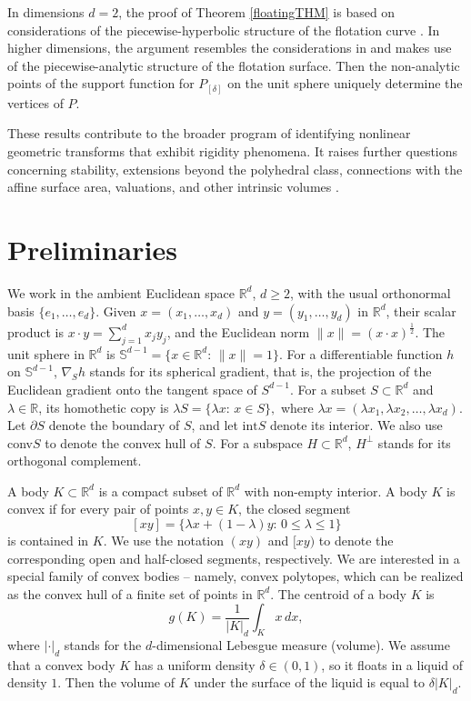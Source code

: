 \documentclass[12pt,letterpaper,reqno]{amsart}
\begin{document}
In dimensions $d=2$, the proof of Theorem \ref{floatingTHM} is based on considerations of the piecewise-hyperbolic structure of the flotation curve \cite{VP,Z}. In higher dimensions, the argument resembles the considerations in \cite{MR2018} and makes use of the piecewise-analytic structure of the flotation surface. Then the non-analytic points of the support function for $P_{[\delta]}$ on the unit sphere uniquely determine the vertices of $P$.

These results contribute to the broader program of identifying nonlinear geometric transforms that exhibit rigidity phenomena. 
It raises further questions concerning stability, extensions beyond the polyhedral class,  connections with the affine surface area, valuations, and other intrinsic volumes \cite{S}.



\section{Preliminaries}
We work in the ambient Euclidean space $\mathbb{R}^d$, $d \geq 2$, with the usual orthonormal basis $\{e_1, \ldots, e_d\}$. Given $x=(x_1, \ldots,x_d)$ and $y=(y_1, \ldots, y_d)$ in $\mathbb{R}^d$, their scalar product is $x\cdot y = \sum_{j=1}^d x_jy_j$, and the Euclidean norm $\|x\| = \left(x \cdot x\right)^{\frac 1 2}$. The unit sphere in $\mathbb{R}^d$ is $\mathbb{S}^{d-1} = \{x \in \mathbb{R}^d: \, \|x\|=1\}.$ 
For a differentiable function $h$ on $\mathbb{S}^{d-1}$, $\nabla_S h$ stands for its spherical gradient, that is, the projection of the Euclidean gradient onto the tangent space of $S^{d-1}$.
For a subset $S \subset \mathbb{R}^d$ and $\lambda \in \mathbb{R}$, its homothetic copy is
$
\lambda S = \{\lambda x: \, x \in S\},
$
where $\lambda x = (\lambda x_1,\lambda x_2, \ldots, \lambda x_d)$. Let $\partial S$ denote the boundary of $S$, and let $\text{int}S$ denote its interior. We also use conv$S$ to denote the convex hull of $S$. For a subspace $H \subset \mathbb{R}^d$, $H^\perp$ stands for its orthogonal complement.

A body $K \subset \mathbb{R}^d$ is a compact subset of $\mathbb{R}^d$ with non-empty interior. A body $K$ is convex if for every pair of points $x,y \in K$, the closed segment 
$$
[xy] = \{\lambda x + (1-\lambda)y: \, 0 \leq \lambda \leq 1 \}
$$
is contained in $K$. We use the notation $(xy)$ and $[xy)$ to denote the corresponding open and half-closed segments, respectively. 
We are interested in a special family of convex bodies -- namely, convex polytopes, which can be realized as the convex hull of a finite set of points in $\mathbb{R}^d$.
The centroid of a body $K$ is 
\begin{equation} \label{centre}
    g(K) = \frac{1}{|K|_d} \int_K x \, dx,
\end{equation}
where $| \cdot |_d$ stands for the $d$-dimensional Lebesgue measure (volume).
We assume that a convex body $K$ has a uniform density $\delta \in(0,1)$, so it floats in a liquid of density $1$. Then the volume of $K$ under the surface of the liquid is equal to $\delta |K|_d$. 
\end{document}
